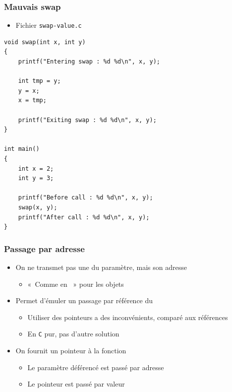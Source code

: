 \begin{frame}[containsverbatim]
\frametitle{Mauvais swap}
\begin{itemize}
\item Fichier \texttt{swap-value.c}
\end{itemize}
\begin{lstlisting}
void swap(int x, int y)
{
    printf("Entering swap : %d %d\n", x, y);
    
    int tmp = y;
    y = x;
    x = tmp;
    
    printf("Exiting swap : %d %d\n", x, y);
}

int main()
{
    int x = 2; 
    int y = 3;
    
    printf("Before call : %d %d\n", x, y);
    swap(x, y);
    printf("After call : %d %d\n", x, y);
}

\end{lstlisting}
\end{frame}

\begin{frame}
\frametitle{Passage par adresse}
\begin{itemize}[<+->]
\item On ne transmet pas une du paramètre, mais son adresse
	\begin{itemize}
	\item «~Comme en \java~» pour les objets
	\end{itemize}
\item Permet d'émuler un passage par référence du \cpp
	\begin{itemize}
	\item Utiliser des pointeurs a des inconvénients, comparé aux références
	\item En \texttt{C} pur, pas d'autre solution	 
	\end{itemize}
\item On fournit un pointeur à la fonction
	\begin{itemize}
	\item Le paramètre déférencé est passé par adresse
	\item Le pointeur est passé par valeur
	\end{itemize}
\end{itemize}
\end{frame}

